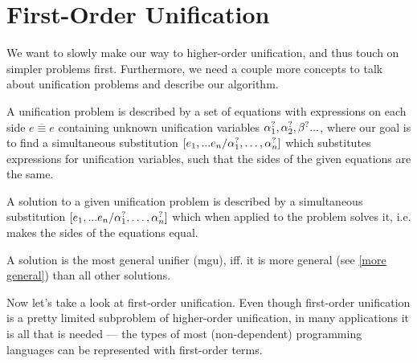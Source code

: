 \documentclass[twoside,12pt,a4paper]{article}
\begin{document}
\begin{prooftree}
\end{prooftree}
\begin{prooftree}
\end{prooftree}    


\section{First-Order Unification}\label{sec:First-Order Unification}

We want to slowly make our way to higher-order unification, and thus touch on simpler problems first. 
Furthermore, we need a couple more concepts to talk about unification problems and describe our algorithm. 

A unification problem is described by a set of equations with expressions on each side $\overline{e\equiv e}$ containing unknown unification variables $\alphaunifvar_1, \alphaunifvar_2, \betaunifvar...$, 
where our goal is to find a simultaneous substitution $[\listofexpr / \alphaunifvar_1, \dots, \alphaunifvar_n]$ which substitutes expressions for unification variables, 
such that the sides of the given equations are the same. 

\begin{definition}[Solution]
    A solution to a given unification problem is described by a simultaneous substitution $[\listofexpr / \alphaunifvar_1, \dots, \alphaunifvar_n]$
    which when applied to the problem solves it, i.e. makes the sides of the equations equal.
\end{definition}
    
\begin{definition}
    A solution is the most general unifier (mgu), iff. it is more general (see \cref{more general}) than all other solutions.
\end{definition} 

Now let's take a look at first-order unification.
Even though first-order unification is a pretty limited subproblem of higher-order unification, 
in many applications it is all that is needed --- the types of most (non-dependent) programming languages can be represented with first-order terms.
\end{document}
